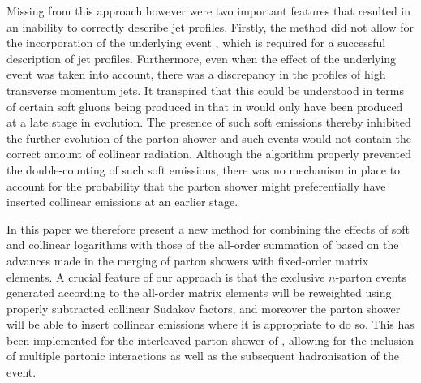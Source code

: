 Missing from this approach however were two important features that resulted in an inability to correctly describe jet profiles. 
Firstly, the method did not allow for the incorporation of the underlying event \cite{Sjostrand:2004ef}, which is required for a 
successful description of jet profiles. Furthermore, even when the effect of the underlying event was taken into account, 
there was a discrepancy in the profiles of high transverse momentum jets. It transpired that this could be 
understood in terms of certain soft gluons being produced in \HEJ that in \ariadne would only have been produced at a late stage in evolution. 
The presence of such soft emissions thereby inhibited the further evolution of the parton shower and 
such events would not contain the correct amount of collinear radiation.
Although the algorithm properly prevented the double-counting of such soft emissions, there was no mechanism in place
to account for the probability that the parton shower might preferentially have inserted collinear emissions at an earlier stage. 

In this paper we therefore present a new
method for combining the effects of soft and collinear logarithms with 
those of the all-order summation of \HEJ based on the advances made
in the merging of parton showers with fixed-order matrix elements. A crucial feature of our approach 
is that the exclusive $n$-parton events generated according to the \HEJ all-order matrix elements 
will be reweighted using properly subtracted collinear Sudakov factors, and moreover the parton shower will be able to 
insert collinear emissions where it is appropriate to do so. 
This has been implemented for the interleaved parton shower of \py \cite{Sjostrand:2014zea}, allowing for
the inclusion of multiple partonic interactions as well as the
subsequent hadronisation of the event.


